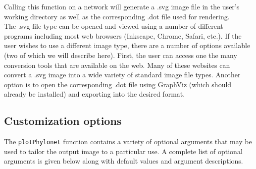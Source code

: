 \documentclass[12pt]{article}
\begin{document}
\noindent Calling this function on a network will generate a .svg image file in the user's working directory
as well as the corresponding .dot file used for rendering. \\

\noindent The .svg file type can be opened and viewed using a number
of different programs including most web browsers (Inkscape, Chrome, Safari, etc.).
If the user wishes to use a different image type, there are a number of options available (two of which we will describe here).
First, the user can access one the many conversion tools that are available on the web. Many of these websites can convert a .svg image into a wide variety of standard image file types.
Another option is to open the corresponding .dot file using GraphViz (which should already be installed) and exporting into the desired format.

\subsection{Customization options}

The \texttt{plotPhylonet} function contains a variety of optional arguments that may be used to tailor the output image to a particular use.
A complete list of optional arguments is given below along with default values and argument descriptions.
\end{document}
